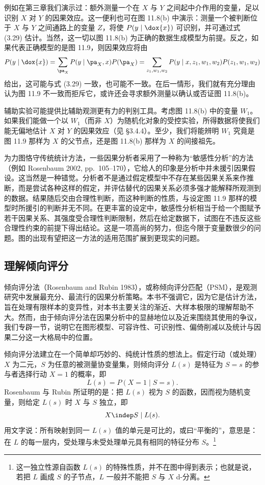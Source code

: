 例如在第三章我们演示过：额外测量一个在 $X$ 与 $Y$ 之间起中介作用的变量，足以识别 $X$ 对 $Y$ 的因果效应。这一便利也可在图 11.8(b) 中演示：测量一个被判断位于 $X$ 与 $Y$ 之间通路上的变量 $Z$，将使 $P(y\mid\dox{x})$ 可识别，并可通过式 (3.29) 估计。当然，这一切以图 11.8(b) 为正确的数据生成模型为前提。反之，如果代表正确模型的是图 11.9，则因果效应将由
\[
P(y\mid\dox{x})=\sum_{\pa_X}P(y\mid\pa_X,x)P(\pa_X)
=\sum_{z_1,w_1,w_2}P(y\mid x,z_1,w_1,w_2)P(z_1,w_1,w_2)
\]
给出，这可能与式 (3.29) 一致，也可能不一致。在后一情形，我们就有充分理由认为图 11.9 不一致而拒斥它，或许还会寻求额外测量以确认或否证图 11.8(b)。

辅助实验可能提供比辅助观测更有力的判别工具。考虑图 11.8(b) 中的变量 $W_1$。如果我们能做一个以 $W_1$（而非 $X$）为随机化对象的受控实验，所得数据将使我们能无偏地估计 $X$ 对 $Y$ 的因果效应（见 \S 3.4.4）。至少，我们将能辨明 $W_1$ 究竟是图 11.9 那样为 $X$ 的父节点，还是图 11.8(b) 那样为 $X$ 的间接祖先。

为力图恪守传统统计方法，一些因果分析者采用了一种称为“敏感性分析”的方法（例如 Rosenbaum 2002, pp.~105--170），它给人的印象是分析中并未援引因果假设。这当然是一种错觉。分析者不是通过假定模型中不存在某些因果关系来作推断，而是尝试各种这样的假定，并评估替代的因果关系必须多强才能解释所观测到的数据。结果随后交由合理性判断，而这种判断的性质，与设定图 11.9 那样的模型时所援引的判断并无不同。在更丰富的设定中，敏感性分析相当于给一个图赋予若干因果关系、其强度受合理性判断限制，然后在给定数据下，试图在不违反这些合理性约束的前提下得出结论。这是一项高尚的努力，但迄今限于变量数很少的问题。图的出现有望把这一方法的适用范围扩展到更现实的问题。

\subsection{理解倾向评分}

倾向评分法（Rosenbaum and Rubin 1983），或称倾向评分匹配（PSM），是观测研究中发展最充分、最流行的因果分析策略。本书不强调它，因为它是估计方法，旨在处理有限样本的变异性，对本书主要关注的渐近、大样本极限的理解帮助不大。然而，由于倾向评分法在因果分析中的显赫地位以及近来围绕其使用的争议，我们专辟一节，说明它在图形模型、可容许性、可识别性、偏倚削减以及统计与因果二分这一大格局中的位置。

倾向评分法建立在一个简单却巧妙的、纯统计性质的想法上。假定行动（或处理）$X$ 为二元，$S$ 为任意的被测量协变量集，则倾向评分 $L(s)$ 是特征为 $S=s$ 的参与者选择行动 $X=1$ 的概率，即
\begin{equation}
L(s)=P(X=1\mid S=s). \tag{11.9}
\end{equation}
Rosenbaum 与 Rubin 所证明的是：把 $L(s)$ 视为 $S$ 的函数，因而视为随机变量，则给定 $L(s)$ 时 $X$ 与 $S$ 独立，即
\[
X\indep S\mid L(s).
\]
用文字说：所有映射到同一 $L(s)$ 值的单元是可比的，或曰“平衡的”，意思是：在 $L$ 的每一层内，受处理与未受处理单元具有相同的特征分布 $S$。\footnote{这一独立性源自函数 $L(s)$ 的特殊性质，并不在图中得到表示；也就是说，若把 $L$ 画成 $S$ 的子节点，$L$ 一般并不能把 $S$ 与 $X$ d-分离。}

